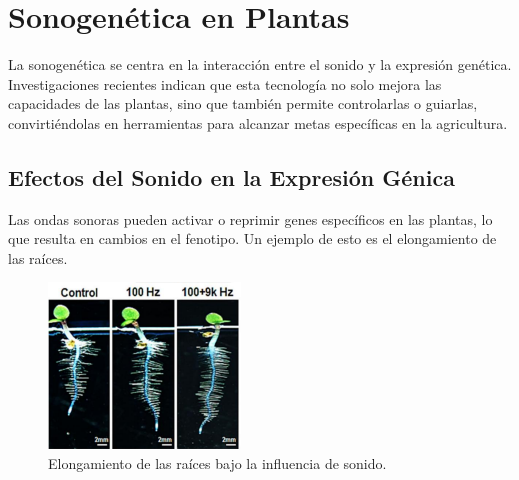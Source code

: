 \documentclass[twocolumn]{article}
\begin{document}
\section{Sonogenética en Plantas}
La sonogenética se centra en la interacción entre el sonido y la expresión genética. Investigaciones recientes indican que esta tecnología no solo mejora las capacidades de las plantas, sino que también permite controlarlas o guiarlas, convirtiéndolas en herramientas para alcanzar metas específicas en la agricultura.

\subsection{Efectos del Sonido en la Expresión Génica}
Las ondas sonoras pueden activar o reprimir genes específicos en las plantas, lo que resulta en cambios en el fenotipo. Un ejemplo de esto es el elongamiento de las raíces.

\begin{figure}[!h]
    \centering
    \includegraphics[width=\linewidth]{imagenes/Captura.PNG}
    \caption{Elongamiento de las raíces bajo la influencia de sonido.}
    \label{fig:elongamiento}
\end{figure}
\end{document}
